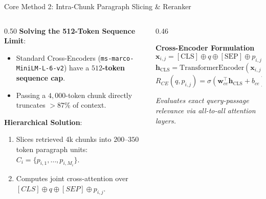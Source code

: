 \documentclass[10pt,aspectratio=169]{beamer}
\begin{document}
\begin{frame}{Core Method 2: Intra-Chunk Paragraph Slicing \& Reranker}
    \begin{columns}[onlytextwidth,T]
        \begin{column}{0.50\textwidth}
            \textbf{Solving the 512-Token Sequence Limit}:
            \begin{itemize}
                \item Standard Cross-Encoders (\texttt{ms-marco-MiniLM-L-6-v2}) have a \textbf{$512$-token sequence cap}.
                \item Passing a $4,000$-token chunk directly truncates $>87\%$ of context.
            \end{itemize}
            
            \vspace{0.15cm}
            \textbf{Hierarchical Solution}:
            \begin{enumerate}
                \item Slices retrieved 4k chunks into $200$--$350$ token paragraph units: $C_i = \{p_{i,1}, \dots, p_{i,M_i}\}$.
                \item Computes joint cross-attention over $[CLS] \oplus q \oplus [SEP] \oplus p_{i,j}$.
            \end{enumerate}
        \end{column}
        
        \begin{column}{0.46\textwidth}
            \begin{exampleblock}{\textbf{Cross-Encoder Formulation}}
                \footnotesize
                $$\mathbf{x}_{i,j} = [\text{CLS}] \oplus q \oplus [\text{SEP}] \oplus p_{i,j} \oplus [\text{SEP}]$$
                $$\mathbf{h}_{\text{CLS}} = \text{TransformerEncoder}(\mathbf{x}_{i,j})_0$$
                $$R_{CE}(q, p_{i,j}) = \sigma( \mathbf{w}_{ce}^\top \mathbf{h}_{\text{CLS}} + b_{ce} ) \in [0, 1]$$
            \end{exampleblock}
            \vspace{0.1cm}
            \footnotesize \textit{Evaluates exact query-passage relevance via all-to-all attention layers.}
        \end{column}
    \end{columns}
\end{frame}
\end{document}
